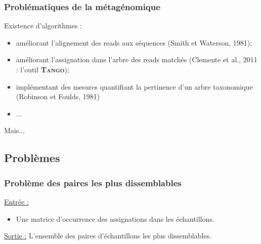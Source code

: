 \documentclass{beamer}
\begin{document}
\begin{frame}
\frametitle{Problématiques de la métagénomique}

Existence d'algorithmes :
\pause
\begin{itemize}
\item améliorant l'alignement des reads aux séquences (Smith et Waterson, 1981);
\pause
\item améliorant l'assignation dans l'arbre des reads matchés (Clemente et al., 2011 : l'outil\textsc{ \bf Tango});
\pause
\item implémentant des mesures quantifiant la pertinence d'un arbre taxonomique (Robinson et Foulds, 1981)
\item ...
\end{itemize}
\pause

\begin{center}
Mais...
\end{center}



\end{frame}

\subsection{Problèmes}

\begin{frame}
\tableofcontents[currentsubsection]
\end{frame}

\begin{frame}
\frametitle{Problème des paires les plus dissemblables}

\uline{Entrée :} \begin{itemize} \item Une matrice d'occurrence des assignations dans les échantillons. \end{itemize}

\bigskip
\uline{Sortie :} L'ensemble des paires d'échantillons les plus dissemblables.

\end{frame}
\end{document}
